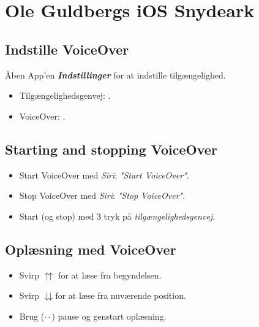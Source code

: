 \documentclass[a4paper, landscape, 10pt]{scrartcl}
\begin{document}
\thispagestyle{empty}

\section*{Ole Guldbergs \faApple iOS \faUniversalAccess Snydeark}

\hrulefill{}
\begin{multicols}{2}

\subsection*{Indstille VoiceOver}
Åben App'en \textbf{\textit{Indstillinger}} for at indstille tilgængelighed.
\begin{itemize}
  \item {Tilgængelighedsgenvej: .}
  \item {VoiceOver: .}
\end{itemize}

\subsection*{Starting and stopping VoiceOver}
\begin{itemize}
  \item{Start VoiceOver med \emph{Siri}: \textit{"Start VoiceOver"}.}
  \item{Stop VoiceOver med \emph{Siri}: \textit{"Stop VoiceOver"}.}
  \item {Start (og stop) med 3 tryk på \emph{tilgængelighedsgenvej}.}
\end{itemize}

\subsection*{Oplæsning med VoiceOver}
\begin{itemize}
  \item{Svirp $\upuparrows$ for at læse fra begyndelsen.}
  \item{Svirp $\downdownarrows$for at læse fra nuværende position.}
  \item{Brug ($\cdot\cdot$) pause og genstart oplæsning.}
\end{itemize}


\end{multicols}
\end{document}

